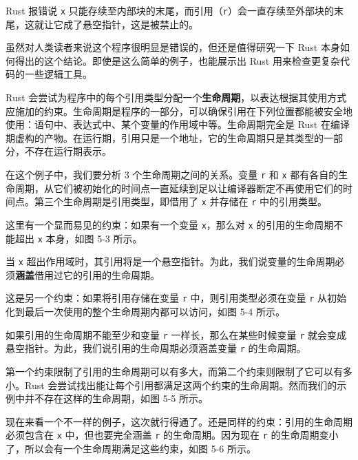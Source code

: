 Rust 报错说 \texttt{x} 只能存续至内部块的末尾，而引用（\texttt{r}）会一直存续至外部块的末尾，这就让它成了悬空指针，这是被禁止的。

虽然对人类读者来说这个程序很明显是错误的，但还是值得研究一下 Rust 本身如何得出的这个结论。即使是这么简单的例子，也能展示出 Rust 用来检查更复杂代码的一些逻辑工具。

Rust 会尝试为程序中的每个引用类型分配一个\textbf{生命周期}，以表达根据其使用方式应施加的约束。生命周期是程序的一部分，可以确保引用在下列位置都能被安全地使用：语句中、表达式中、某个变量的作用域中等。生命周期完全是 Rust 在编译期虚构的产物。在运行期，引用只是一个地址，它的生命周期只是其类型的一部分，不存在运行期表示。

在这个例子中，我们要分析 3 个生命周期之间的关系。变量 \texttt{r} 和 \texttt{x} 都有各自的生命周期，从它们被初始化的时间点一直延续到足以让编译器断定不再使用它们的时间点。第三个生命周期是引用类型，即借用了 \texttt{x} 并存储在 \texttt{r} 中的引用类型。

这里有一个显而易见的约束：如果有一个变量 \texttt{x}，那么对 \texttt{x} 的引用的生命周期不能超出 \texttt{x} 本身，如图 5-3 所示。


当 \texttt{x} 超出作用域时，其引用将是一个悬空指针。为此，我们说变量的生命周期必须\textbf{涵盖}借用过它的引用的生命周期。

这是另一个约束：如果将引用存储在变量 \texttt{r} 中，则引用类型必须在变量 \texttt{r} 从初始化到最后一次使用的整个生命周期内都可以访问，如图 5-4 所示。


如果引用的生命周期不能至少和变量 \texttt{r} 一样长，那么在某些时候变量 \texttt{r} 就会变成悬空指针。为此，我们说引用的生命周期必须涵盖变量 \texttt{r} 的生命周期。

第一个约束限制了引用的生命周期可以有多大，而第二个约束则限制了它可以有多小。Rust 会尝试找出能让每个引用都满足这两个约束的生命周期。然而我们的示例中并不存在这样的生命周期，如图 5-5 所示。


现在来看一个不一样的例子，这次就行得通了。还是同样的约束：引用的生命周期必须包含在 \texttt{x} 中，但也要完全涵盖 \texttt{r} 的生命周期。因为现在 \texttt{r} 的生命周期变小了，所以会有一个生命周期满足这些约束，如图 5-6 所示。

